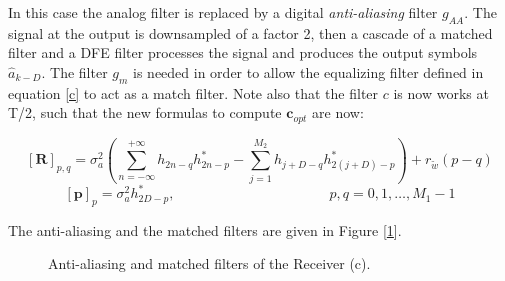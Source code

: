 \documentclass[a4paper, 12pt]{report}
\begin{document}
In this case the analog filter is replaced by a digital \textit{anti-aliasing} filter $g_{AA}$. The signal at the output is downsampled of a factor 2, then a cascade of a matched filter and a DFE  filter processes the signal and produces the output symbols $\hat{a}_{k-D}$. The filter $g_m$ is needed in order to allow the equalizing filter defined in equation \ref{c} to act as a match filter. Note also that the filter $c$ is now works at T/2, such that the new formulas to compute $\mathbf{c}_{opt}$ are now:

\begin{equation}
\mathbf{[R]}_{p,q} = \sigma_a^2 \left( \sum_{n=-\infty}^{+\infty}h_{2n-q}h^*_{2n-p}-\sum_{j=1}^{M_2}h_{j+D-q}h^*_{2(j+D)-p} \right) + r_{\tilde{w}}(p-q)
\end{equation}
\begin{equation}
\mathbf{[p]}_p = \sigma_a^2 h^*_{2D-p}, \quad\quad\quad\quad\quad\quad\quad\quad\quad\quad\quad p,q = 0,1,\dots,M_1-1
\end{equation}

The anti-aliasing and the matched filters are given in Figure [\ref{filters_c}].

\begin{figure}[H]
	\centering
	\caption{Anti-aliasing and matched filters of the Receiver (c).}\label{filters_c}
\end{figure}
\end{document}
